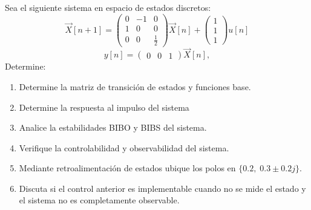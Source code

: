\documentclass[
  11pt,
  letterpaper,
   addpoints,
   answers
  ]{exam}
\begin{document}
\begin{questions}
\question
Sea el siguiente sistema en espacio de estados discretos:
\begin{equation}
  \vec{X}[n+1] = \begin{pmatrix} 0 & -1 & 0 \\ 1 & 0 & 0 \\ 0 & 0 & \frac{1}{2} \end{pmatrix} \vec{X}[n] + \begin{pmatrix} 1 \\ 1 \\ 1 \end{pmatrix} u[n]
\end{equation}
\begin{equation}
  y[n] = \begin{pmatrix} 0 & 0 & 1 \end{pmatrix} \vec{X}[n],
\end{equation}
Determine:
\begin{enumerate}
  \item Determine la matriz de transición de estados y funciones base.

  \item Determine la respuesta al impulso del sistema

  \item   Analice la estabilidades BIBO y BIBS del sistema.

  \item Verifique la controlabilidad y observabilidad del sistema.

  \item Mediante retroalimentación de estados ubique los polos en $\{0.2,\;0.3\pm 0.2j\}$.

  \item  Discuta si el control anterior es implementable cuando no se mide el estado
  y el sistema no es completamente observable.
\end{enumerate}
\begin{solution}

\end{solution}
\end{questions}
\end{document}
